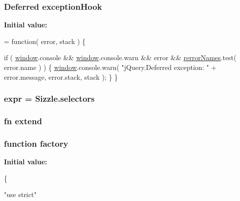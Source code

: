 \subsubsection[{\texorpdfstring{exception\+Hook}{exceptionHook}}]{ Deferred exception\+Hook}\hypertarget{jquery-3_82_81_8js_a0094c36c24cb568ce0da74328522ec43}{}\label{jquery-3_82_81_8js_a0094c36c24cb568ce0da74328522ec43}
{\bfseries Initial value\+:}
\begin{DoxyCode}
= \textcolor{keyword}{function}( error, stack ) \{

    
    
    \textcolor{keywordflow}{if} ( \hyperlink{jquery-3_82_81_8js_ad55530ae1e5978df8e721017c1fc8466}{window}.console && \hyperlink{jquery-3_82_81_8js_ad55530ae1e5978df8e721017c1fc8466}{window}.console.warn && error && 
      \hyperlink{jquery-3_82_81_8js_a7c436c95688c6936f28388d5b3712ed0}{rerrorNames}.test( error.name ) ) \{
        \hyperlink{jquery-3_82_81_8js_ad55530ae1e5978df8e721017c1fc8466}{window}.console.warn( \textcolor{stringliteral}{"jQuery.Deferred exception: "} + error.message, error.stack, stack );
    \}
\}
\end{DoxyCode}
\subsubsection[{\texorpdfstring{expr}{expr}}]{ expr = Sizzle.\+selectors}\hypertarget{jquery-3_82_81_8js_aaacd1d5b3593ba4dfff6d67d4f6cfda1}{}\label{jquery-3_82_81_8js_aaacd1d5b3593ba4dfff6d67d4f6cfda1}
\subsubsection[{\texorpdfstring{extend}{extend}}]{ {\bf fn} extend}\hypertarget{jquery-3_82_81_8js_aac35e191adb9b382ad4244530e4e1b3d}{}\label{jquery-3_82_81_8js_aac35e191adb9b382ad4244530e4e1b3d}
\subsubsection[{\texorpdfstring{factory}{factory}}]{\setlength{\rightskip}{0pt plus 5cm}function factory}\hypertarget{jquery-3_82_81_8js_abf075bdbe59fd2c3336ed052c9c72b31}{}\label{jquery-3_82_81_8js_abf075bdbe59fd2c3336ed052c9c72b31}
{\bfseries Initial value\+:}
\begin{DoxyCode}
\{

    \textcolor{stringliteral}{"use strict"}
\end{DoxyCode}
